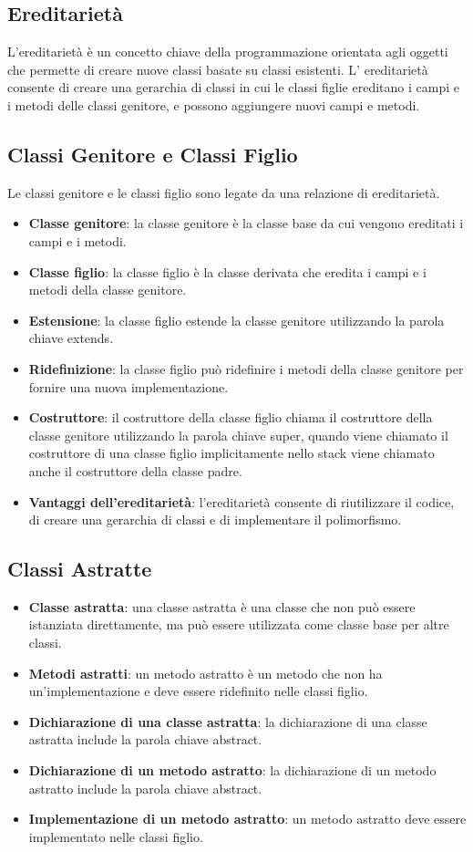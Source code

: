 \documentclass[11pt]{article}
\begin{document}
\subsection{Ereditarietà}
L'ereditarietà è un concetto chiave della programmazione orientata agli oggetti che permette di creare nuove classi basate su classi esistenti.
L' ereditarietà consente di creare una gerarchia di classi in cui le classi figlie ereditano i campi e i metodi delle classi genitore, e possono aggiungere nuovi campi e metodi.
\subsection{Classi Genitore e Classi Figlio}
Le classi genitore e le classi figlio sono legate da una relazione di ereditarietà.
\begin{itemize}
    \item \textbf{Classe genitore}: la classe genitore è la classe base da cui vengono ereditati i campi e i metodi.
    \item \textbf{Classe figlio}: la classe figlio è la classe derivata che eredita i campi e i metodi della classe genitore.
    \item \textbf{Estensione}: la classe figlio estende la classe genitore utilizzando la parola chiave extends.
    \item \textbf{Ridefinizione}: la classe figlio può ridefinire i metodi della classe genitore per fornire una nuova implementazione.
    \item \textbf{Costruttore}: il costruttore della classe figlio chiama il costruttore della classe genitore utilizzando la parola chiave super, quando viene chiamato il costruttore di una classe figlio implicitamente nello stack viene chiamato anche il costruttore della classe padre.
    \item \textbf{Vantaggi dell'ereditarietà}: l'ereditarietà consente di riutilizzare il codice, di creare una gerarchia di classi e di implementare il polimorfismo.
\end{itemize}
\subsection{Classi Astratte}
\begin{itemize}
    \item \textbf{Classe astratta}: una classe astratta è una classe che non può essere istanziata direttamente, ma può essere utilizzata come classe base per altre classi.
    \item \textbf{Metodi astratti}: un metodo astratto è un metodo che non ha un'implementazione e deve essere ridefinito nelle classi figlio.
    \item \textbf{Dichiarazione di una classe astratta}: la dichiarazione di una classe astratta include la parola chiave abstract.
    \item \textbf{Dichiarazione di un metodo astratto}: la dichiarazione di un metodo astratto include la parola chiave abstract.
    \item \textbf{Implementazione di un metodo astratto}: un metodo astratto deve essere implementato nelle classi figlio.
    \end{itemize}
\end{document}
